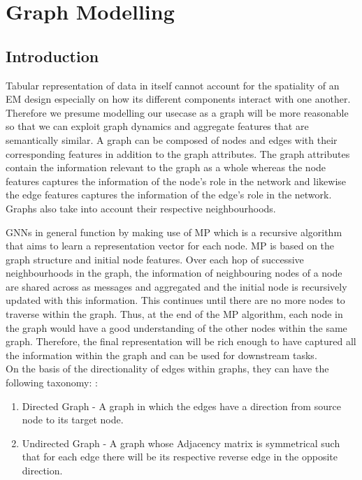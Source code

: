 \documentclass{report} %
\begin{document}
\newpage 

\chapter{Graph Modelling} 

\section{Introduction}\label{sec:Introduction}

Tabular representation of data in itself cannot account for the spatiality of an \ac{EM} design especially on how its different components interact with one another. 
Therefore we presume modelling our usecase as a graph will be more reasonable so that we can exploit graph dynamics and aggregate features that are semantically similar.
A graph can be composed of nodes and edges with their corresponding features in addition to the graph attributes.
The graph attributes contain the information relevant to the graph as a whole whereas the node features captures the information of the node's role in the network and 
likewise the edge features captures the information of the edge's role in the network. Graphs also take into account their respective neighbourhoods.

\ac{GNN}s in general function by making use of \ac{MP} which is a recursive algorithm that aims to learn a representation vector for each node. 
\ac{MP} is based on the graph structure and initial node features. Over each hop of successive neighbourhoods in the graph, the information of 
neighbouring nodes of a node are shared across as messages and aggregated and the initial node is recursively updated with this information. 
This continues until there are no more nodes to traverse within the graph.
Thus, at the end of the \ac{MP} algorithm, each node in the graph would have a good understanding of the other nodes within the same graph.
Therefore, the final representation will be rich enough to have captured all the information within the graph and can be used for downstream tasks.\\

On the basis of the directionality of edges within graphs, they can have the following taxonomy: \cite{GNN-2019}:
\begin{enumerate}
    \item Directed Graph - A graph in which the edges have a direction from source node to its target node.
    \item Undirected Graph - A graph whose Adjacency matrix is symmetrical such that for each edge there will be its respective reverse edge in the opposite direction.
\end{enumerate}
\end{document}
